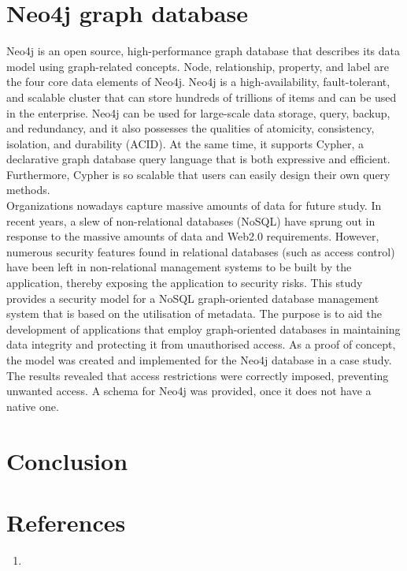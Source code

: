 \documentclass[paper=a4, fontsize=11pt]{scrartcl}
\numberwithin{equation}{section}		%
\numberwithin{figure}{section}			%
\numberwithin{table}{section}				%
\begin{document}
\section{Neo4j graph database}
Neo4j is an open source, high-performance graph database that describes its data model using graph-related concepts. Node, relationship, property, and label are the four core data elements of Neo4j. Neo4j is a high-availability, fault-tolerant, and scalable cluster that can store hundreds of trillions of items and can be used in the enterprise. Neo4j can be used for large-scale data storage, query, backup, and redundancy, and it also possesses the qualities of atomicity, consistency, isolation, and durability (ACID). At the same time, it supports Cypher, a declarative graph database query language that is both expressive and efficient. Furthermore, Cypher is so scalable that users can easily design their own query methods.
\\
Organizations nowadays capture massive amounts of data for future study. In recent years, a slew of non-relational databases (NoSQL) have sprung out in response to the massive amounts of data and Web2.0 requirements. However, numerous security features found in relational databases (such as access control) have been left in non-relational management systems to be built by the application, thereby exposing the application to security risks. This study provides a security model for a NoSQL graph-oriented database management system that is based on the utilisation of metadata. The purpose is to aid the development of applications that employ graph-oriented databases in maintaining data integrity and protecting it from unauthorised access. As a proof of concept, the model was created and implemented for the Neo4j database in a case study.
\\
The results revealed that access restrictions were correctly imposed, preventing unwanted access. A schema for Neo4j was provided, once it does not have a native one.



\section{Conclusion}

\newpage
\section{References}
\begin{enumerate}
    \item 
\end{enumerate}
\end{document}
